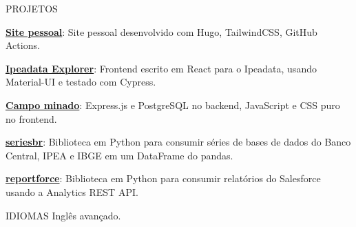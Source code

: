\documentclass{resume}
\begin{document}
\begin{rSection}{PROJETOS}
  \begin{rSubsection}{}{}{}{}
  \item \href{https://phelipetls.github.io}{\textbf{Site pessoal}}: Site pessoal
    desenvolvido com Hugo, TailwindCSS, GitHub Actions.
  \item \href{http://ipeadata-explorer.surge.sh}{\textbf{Ipeadata Explorer}}:
    Frontend escrito em React para o Ipeadata, usando Material-UI e testado com
    Cypress.
  \item \href{https://github.com/phelipetls/minesweeper.js}{\textbf{Campo
    minado}}: Express.js e PostgreSQL no backend, JavaScript e CSS puro no
    frontend.
  \item \href{https://github.com/phelipetls/seriesbr}{\textbf{seriesbr}}:
    Biblioteca em Python para consumir séries de bases de dados do Banco
    Central, IPEA e IBGE em um DataFrame do pandas.
  \item \href{https://github.com/phelipetls/reportforce}{\textbf{reportforce}}:
    Biblioteca em Python para consumir relatórios do Salesforce usando a
    Analytics REST API.
  \end{rSubsection}
\end{rSection}


\begin{rSection}{IDIOMAS} \itemsep -3pt
    {Inglês avançado.}
\end{rSection}
\end{document}
